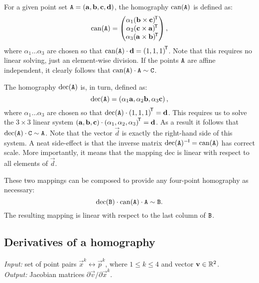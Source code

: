 For a given point set $\mathtt{A} = \left( \mathbf{a}, \mathbf{b}, \mathbf{c}, \mathbf{d} \right)$, the homography $\mathrm{can}(\mathtt{A})$ is defined as:
$$\mathrm{can}(\mathtt{A}) = \begin{pmatrix}
 \alpha_1 (\mathbf{b} \times \mathbf{c}) ^{\!\mathsf{T}} \\
 \alpha_2 (\mathbf{c} \times \mathbf{a}) ^{\!\mathsf{T}} \\
 \alpha_3 (\mathbf{a} \times \mathbf{b}) ^{\!\mathsf{T}} \\
 \end{pmatrix},
$$
where $\alpha_1 \dots \alpha_3$ are chosen so that $\mathrm{can}(\mathtt{A}) \cdot \mathbf{d} = \left( 1, 1, 1 \right)^{\!\mathsf{T}}$.
Note that this requires no linear solving, just an element-wise division.
If the points $\mathtt{A}$ are affine independent, it clearly follows that $\mathrm{can}(\mathtt{A}) \cdot \mathtt{A} \sim \mathtt{C}$.

The homography $\mathrm{dec}(\mathtt{A})$ is, in turn, defined as:
$$\mathrm{dec}(\mathtt{A}) = \left( \alpha_1 \mathbf{a}, \alpha_2 \mathbf{b}, \alpha_3 \mathbf{c} \right),$$
where $\alpha_1 \dots \alpha_3$ are chosen so that $\mathrm{dec}(\mathtt{A}) \cdot \left( 1, 1, 1 \right)^{\!\mathsf{T}} = \mathbf{d}$.
This requires us to solve the $3 \times 3$ linear system $\left(\mathbf{a}, \mathbf{b}, \mathbf{c} \right) \cdot \left(\alpha_1, \alpha_2, \alpha_3 \right) ^{\!\mathsf{T}} = \mathbf{d}$.
As a result it follows that $\mathrm{dec}(\mathtt{A}) \cdot \mathtt{C} \sim \mathtt{A}$.
Note that the vector $\vec d$ is exactly the right-hand side of this system.
A neat side-effect is that the inverse matrix $\mathrm{dec}(\mathtt{A}) ^{-\mathsf{I}} = \mathrm{can}(\mathtt{A})$ has correct scale. 
More importantly, it means that the mapping $\mathrm{dec}$ is linear with respect to all elements of $\vec d$.

These two mappings can be composed to provide any four-point homography as necessary:
$$\mathrm{dec}(\mathtt{B}) \cdot \mathrm{can}(\mathtt{A}) \cdot \mathtt{A} \sim \mathtt{B}.$$
The resulting mapping is linear with respect to the last column of $\mathtt{B}$.


\subsection{Derivatives of a homography}
\label{s.homderivatives}

\textit{Input:} set of point pairs $\vec x^k \leftrightarrow \vec p^k$, where $1 \leq k \leq 4$ and vector $\mathbf{v} \in \mathbb{R}^2$.\\
\textit{Output:} Jacobian matrices $\partial \vec v / \partial \vec x^k$.\\

